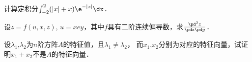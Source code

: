 \documentclass[plain,noanswer,medmath]{../../template/jnuexam}
\begin{document}














\begin{problem}[points=6]
计算定积分$\int_{-2}^2 (|x|+x)\e^{-|x|} \dx$．
\end{problem}





\begin{problem}
设$z = f(u,x,z)$, $u = xey$，其中$f$具有二阶连续偏导数，求$\frac{\pd^2 z}{\pdx\pd y}$．
\end{problem}




























\begin{problem}
设$\lambda_1$,$\lambda_2$为$n$阶方阵$A$的特征值，且$\lambda_1 \ne \lambda_2$，
而$x_1$,$x_2$分别为对应的特征向量，试证明$x_1 + x_2$不是$A$的特征向量．
\end{problem}
\end{document}
